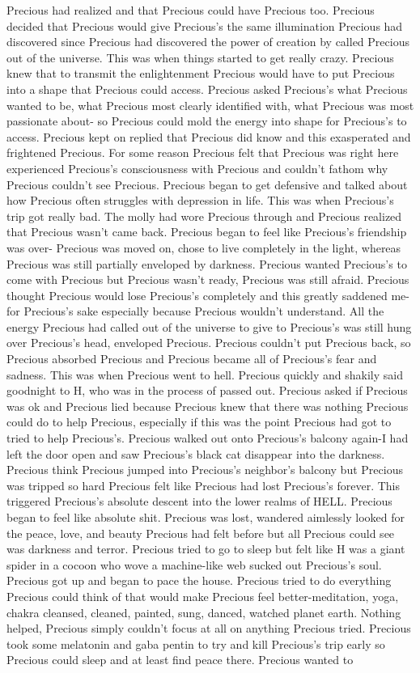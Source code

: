 \documentclass[12pt]{book}
\begin{document}
Precious had realized and that Precious could have Precious too. Precious decided that Precious would give Precious's the same illumination Precious had discovered since Precious had discovered the power of creation by called Precious out of the universe. This was when things started to get really crazy. Precious knew that to transmit the enlightenment Precious would have to put Precious into a shape that Precious could access. Precious asked Precious's what Precious wanted to be, what Precious most clearly identified with, what Precious was most passionate about- so Precious could mold the energy into shape for Precious's to access. Precious kept on replied that Precious did know and this exasperated and frightened Precious. For some reason Precious felt that Precious was right here experienced Precious's consciousness with Precious and couldn't fathom why Precious couldn't see Precious. Precious began to get defensive and talked about how Precious often struggles with depression in life. This was when Precious's trip got really bad. The molly had wore Precious through and Precious realized that Precious wasn't came back. Precious began to feel like Precious's friendship was over- Precious was moved on, chose to live completely in the light, whereas Precious was still partially enveloped by darkness. Precious wanted Precious's to come with Precious but Precious wasn't ready, Precious was still afraid. Precious thought Precious would lose Precious's completely and this greatly saddened me-for Precious's sake especially because Precious wouldn't understand. All the energy Precious had called out of the universe to give to Precious's was still hung over Precious's head, enveloped Precious. Precious couldn't put Precious back, so Precious absorbed Precious and Precious became all of Precious's fear and sadness. This was when Precious went to hell. Precious quickly and shakily said goodnight to H, who was in the process of passed out. Precious asked if Precious was ok and Precious lied because Precious knew that there was nothing Precious could do to help Precious, especially if this was the point Precious had got to tried to help Precious's. Precious walked out onto Precious's balcony again-I had left the door open and saw Precious's black cat disappear into the darkness. Precious think Precious jumped into Precious's neighbor's balcony but Precious was tripped so hard Precious felt like Precious had lost Precious's forever. This triggered Precious's absolute descent into the lower realms of HELL. Precious began to feel like absolute shit. Precious was lost, wandered aimlessly looked for the peace, love, and beauty Precious had felt before but all Precious could see was darkness and terror. Precious tried to go to sleep but felt like H was a giant spider in a cocoon who wove a machine-like web sucked out Precious's soul. Precious got up and began to pace the house. Precious tried to do everything Precious could think of that would make Precious feel better-meditation, yoga, chakra cleansed, cleaned, painted, sung, danced, watched planet earth. Nothing helped, Precious simply couldn't focus at all on anything Precious tried. Precious took some melatonin and gaba pentin to try and kill Precious's trip early so Precious could sleep and at least find peace there. Precious wanted to 
\end{document}
